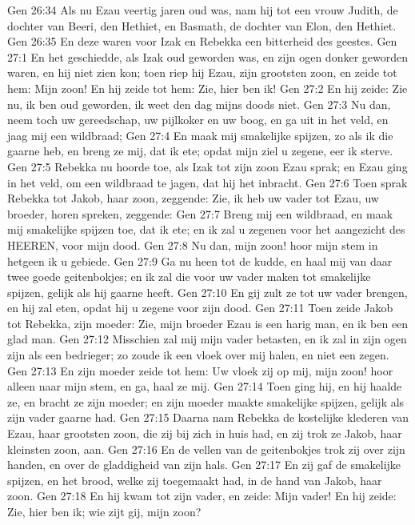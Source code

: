 Gen 26:34  Als nu Ezau veertig jaren oud was, nam hij tot een vrouw Judith, de dochter van Beeri, den Hethiet, en Basmath, de dochter van Elon, den Hethiet.
Gen 26:35  En deze waren voor Izak en Rebekka een bitterheid des geestes.
Gen 27:1  En het geschiedde, als Izak oud geworden was, en zijn ogen donker geworden waren, en hij niet zien kon; toen riep hij Ezau, zijn grootsten zoon, en zeide tot hem: Mijn zoon! En hij zeide tot hem: Zie, hier ben ik!
Gen 27:2  En hij zeide: Zie nu, ik ben oud geworden, ik weet den dag mijns doods niet.
Gen 27:3  Nu dan, neem toch uw gereedschap, uw pijlkoker en uw boog, en ga uit in het veld, en jaag mij een wildbraad;
Gen 27:4  En maak mij smakelijke spijzen, zo als ik die gaarne heb, en breng ze mij, dat ik ete; opdat mijn ziel u zegene, eer ik sterve.
Gen 27:5  Rebekka nu hoorde toe, als Izak tot zijn zoon Ezau sprak; en Ezau ging in het veld, om een wildbraad te jagen, dat hij het inbracht.
Gen 27:6  Toen sprak Rebekka tot Jakob, haar zoon, zeggende: Zie, ik heb uw vader tot Ezau, uw broeder, horen spreken, zeggende:
Gen 27:7  Breng mij een wildbraad, en maak mij smakelijke spijzen toe, dat ik ete; en ik zal u zegenen voor het aangezicht des HEEREN, voor mijn dood.
Gen 27:8  Nu dan, mijn zoon! hoor mijn stem in hetgeen ik u gebiede.
Gen 27:9  Ga nu heen tot de kudde, en haal mij van daar twee goede geitenbokjes; en ik zal die voor uw vader maken tot smakelijke spijzen, gelijk als hij gaarne heeft.
Gen 27:10  En gij zult ze tot uw vader brengen, en hij zal eten, opdat hij u zegene voor zijn dood.
Gen 27:11  Toen zeide Jakob tot Rebekka, zijn moeder: Zie, mijn broeder Ezau is een harig man, en ik ben een glad man.
Gen 27:12  Misschien zal mij mijn vader betasten, en ik zal in zijn ogen zijn als een bedrieger; zo zoude ik een vloek over mij halen, en niet een zegen.
Gen 27:13  En zijn moeder zeide tot hem: Uw vloek zij op mij, mijn zoon! hoor alleen naar mijn stem, en ga, haal ze mij.
Gen 27:14  Toen ging hij, en hij haalde ze, en bracht ze zijn moeder; en zijn moeder maakte smakelijke spijzen, gelijk als zijn vader gaarne had.
Gen 27:15  Daarna nam Rebekka de kostelijke klederen van Ezau, haar grootsten zoon, die zij bij zich in huis had, en zij trok ze Jakob, haar kleinsten zoon, aan.
Gen 27:16  En de vellen van de geitenbokjes trok zij over zijn handen, en over de gladdigheid van zijn hals.
Gen 27:17  En zij gaf de smakelijke spijzen, en het brood, welke zij toegemaakt had, in de hand van Jakob, haar zoon.
Gen 27:18  En hij kwam tot zijn vader, en zeide: Mijn vader! En hij zeide: Zie, hier ben ik; wie zijt gij, mijn zoon?
